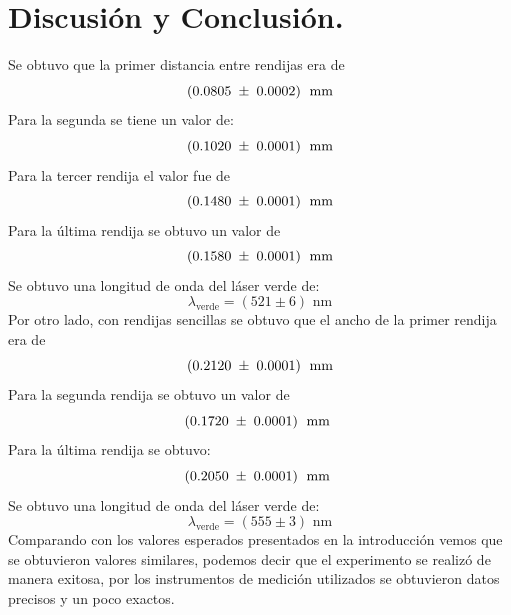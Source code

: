 \documentclass[DIV=calc, paper=a4, fontsize=10.5pt]{scrartcl}
\begin{document}
\section*{\textcolor{carmine}{Discusión y Conclusión.}}
Se obtuvo que la primer distancia entre rendijas era de 
$$(0.0805\hspace{0.1cm}\pm\hspace{0.1cm}0.0002)\hspace{0.1cm}\text{ mm}$$
Para la segunda se tiene un valor de: $$(0.1020\hspace{0.1cm}\pm\hspace{0.1cm}0.0001)\hspace{0.1cm}\text{ mm}$$ 
Para la tercer rendija el valor fue de $$(0.1480\hspace{0.1cm}\pm\hspace{0.1cm}0.0001)\hspace{0.1cm}\text{ mm}$$ 
Para la última rendija se obtuvo un valor de $$(0.1580\hspace{0.1cm}\pm\hspace{0.1cm}0.0001)\hspace{0.1cm}\text{ mm}$$ 
Se obtuvo una longitud de onda del láser verde de:
$$\lambda_{\text{verde}} = (521 \pm 6) \text{ nm}$$ 
Por otro lado, con rendijas sencillas se obtuvo que el ancho de la primer rendija era de $$(0.2120\hspace{0.1cm}\pm\hspace{0.1cm}0.0001)\hspace{0.1cm}\text{ mm}$$ 
Para la segunda rendija se obtuvo un valor de  $$(0.1720\hspace{0.1cm}\pm\hspace{0.1cm}0.0001)\hspace{0.1cm}\text{ mm }$$ 
Para la última rendija se obtuvo: $$(0.2050\hspace{0.1cm}\pm\hspace{0.1cm}0.0001)\hspace{0.1cm}\text{ mm }$$
Se obtuvo una longitud de onda del láser verde de:
$$\lambda_{\text{verde}} = (555 \pm 3) \text{ nm}$$
Comparando con los valores esperados presentados en la introducción vemos que se obtuvieron valores similares, podemos decir que el experimento se realizó de manera exitosa, por los instrumentos de medición utilizados se obtuvieron datos precisos y un poco exactos.

\nocite{*}


\end{document}
